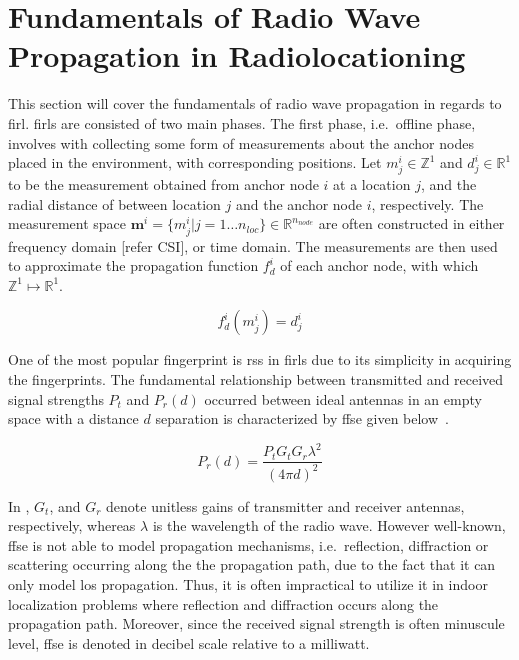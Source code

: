 \section{Fundamentals of Radio Wave Propagation in Radiolocationing}
\label{sec:fundamentals}
    This section will cover the fundamentals of radio wave propagation in regards to \gls{firl}.
    \Gls{firl}s are consisted of two main phases.
    The first phase, i.e.\ offline phase,  involves with collecting some form of measurements about the anchor nodes placed in the environment, with corresponding positions.
    Let $m^i_j \in \mathbb{Z}^1$ and $d^i_j \in \mathbb{R}^1$ to be the measurement obtained from anchor node $i$ at a location $j$, and the radial distance of between location $j$ and the anchor node $i$, respectively.
    The measurement space $\bm{m}^i=\{m^i_j | j=1 \ldots n_{loc}\} \in \mathbb{R}^{n_{node}}$ are often constructed in either frequency domain [refer CSI], or time domain.
    The measurements are then used to approximate the propagation function $f^i_d$ of each anchor node, with which $\mathbb{Z}^1\mapsto\mathbb{R}^1$.

    \begin{equation}
        f^i_d(m^i_j)=d^i_j
    \end{equation}

    One of the most popular fingerprint is \gls{rss} in \gls{firl}s due to its simplicity in acquiring the fingerprints.
    The fundamental relationship between transmitted and received signal strengths $P_t$ and $P_r(d)$ occurred between ideal antennas in an empty space with a distance $d$ separation is characterized by \gls{ffse} given below~\cite{friis1946note}.

    \begin{equation}
        \label{eq:friisWatts}
            P_r(d) = \dfrac{P_t  G_t  G_r \lambda^2}{{\left(4 \pi d\right)}^2}
    \end{equation}

    In , $G_t$, and $G_r$ denote unitless gains of transmitter and receiver antennas, respectively, whereas $\lambda$ is the wavelength of the radio wave.
    However well-known, \gls{ffse} is not able to model propagation mechanisms, i.e.\ reflection, diffraction or scattering occurring along the the propagation path, due to the fact that it can only model \gls{los} propagation.
    Thus, it is often impractical to utilize it in indoor localization problems where reflection and diffraction occurs along the propagation path.
    Moreover, since the received signal strength is often minuscule level, \gls{ffse} is denoted in decibel scale relative to a milliwatt.


